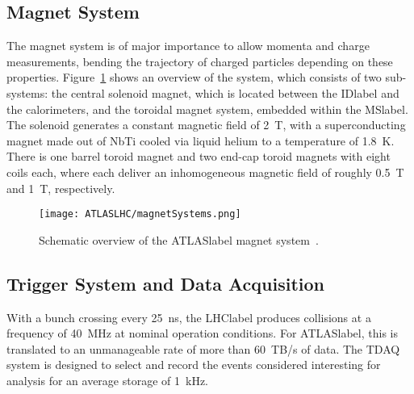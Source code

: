 \subsection{Magnet System}

The magnet system is of major importance to allow momenta and charge measurements, bending the trajectory of charged particles depending on these properties. Figure~\ref{figLHC:ATLASMagnets} shows an overview of the system, which consists of two sub-systems: the central solenoid magnet, which is located between the \acrshort{IDlabel} and the calorimeters, and the toroidal magnet system, embedded within the \acrshort{MSlabel}. The solenoid generates a constant magnetic field of 2~T, with a superconducting magnet made out of NbTi cooled via liquid helium to a temperature of 1.8~K. There is one barrel toroid magnet and two end-cap toroid magnets with eight coils each, where each deliver an inhomogeneous magnetic field of roughly 0.5~T and 1~T, respectively.

\begin{figure}[htbp]
    \RawFloats
    \begin{center}
    \texttt{[image: ATLASLHC/magnetSystems.png]}
    \caption{
        Schematic overview of the \acrshort{ATLASlabel} magnet system~\cite{JetGoodson}. 
    }
    \label{figLHC:ATLASMagnets}
    \end{center}
\end{figure}

\subsection{Trigger System and Data Acquisition}

With a bunch crossing every 25~ns, the \acrshort{LHClabel} produces collisions at a frequency of 40~MHz at nominal operation conditions. For \acrshort{ATLASlabel}, this is translated to an unmanageable rate of more than 60~TB/s of data. The TDAQ system is designed to select and record the events considered interesting for analysis for an average storage of 1~kHz.

